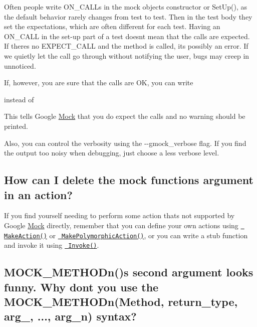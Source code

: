 Often people write {\ttfamily O\+N\+\_\+\+C\+A\+LL}s in the mock object\textquotesingle{}s constructor or {\ttfamily Set\+Up()}, as the default behavior rarely changes from test to test. Then in the test body they set the expectations, which are often different for each test. Having an {\ttfamily O\+N\+\_\+\+C\+A\+LL} in the set-\/up part of a test doesn\textquotesingle{}t mean that the calls are expected. If there\textquotesingle{}s no {\ttfamily E\+X\+P\+E\+C\+T\+\_\+\+C\+A\+LL} and the method is called, it\textquotesingle{}s possibly an error. If we quietly let the call go through without notifying the user, bugs may creep in unnoticed.

If, however, you are sure that the calls are OK, you can write


\begin{DoxyCode}{0}
\end{DoxyCode}


instead of


\begin{DoxyCode}{0}
\end{DoxyCode}


This tells Google \mbox{\hyperlink{classMock}{Mock}} that you do expect the calls and no warning should be printed.

Also, you can control the verbosity using the {\ttfamily -\/-\/gmock\+\_\+verbose} flag. If you find the output too noisy when debugging, just choose a less verbose level.

\subsection*{How can I delete the mock function\textquotesingle{}s argument in an action?}

If you find yourself needing to perform some action that\textquotesingle{}s not supported by Google \mbox{\hyperlink{classMock}{Mock}} directly, remember that you can define your own actions using \href{CookBook.md\#writing-new-actions}{\texttt{ Make\+Action()}} or \href{CookBook.md\#writing_new_polymorphic_actions}{\texttt{ Make\+Polymorphic\+Action()}}, or you can write a stub function and invoke it using \href{CookBook.md\#using-functions_methods_functors}{\texttt{ Invoke()}}.

\subsection*{M\+O\+C\+K\+\_\+\+M\+E\+T\+H\+O\+Dn()\textquotesingle{}s second argument looks funny. Why don\textquotesingle{}t you use the M\+O\+C\+K\+\_\+\+M\+E\+T\+H\+O\+Dn(\+Method, return\+\_\+type, arg\+\_, ..., arg\+\_\+n) syntax?}

